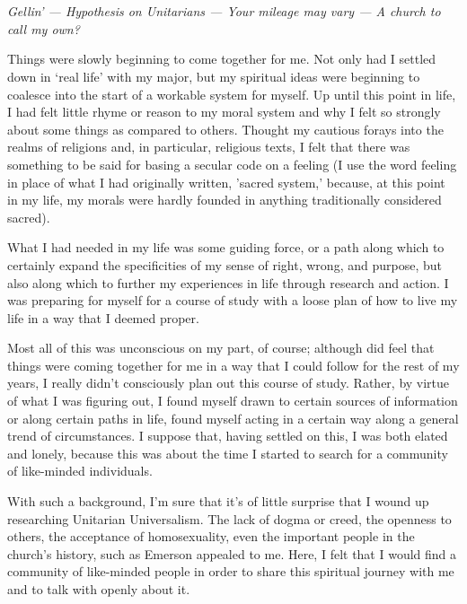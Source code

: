 \documentclass{book}
\begin{document}
\chapter{}
\begin{center}
	\emph{Gellin' --- Hypothesis on Unitarians --- Your mileage may vary --- A church to call my own?}
\end{center}

Things were slowly beginning to come together for me.  Not only had I settled down in `real life' with my major, but my spiritual ideas were beginning to coalesce into the start of a workable system for myself.  Up until this point in life, I had felt little rhyme or reason to my moral system and why I felt so strongly about some things as compared to others.  Thought my cautious forays into the realms of religions and, in particular, religious texts, I felt that there was something to be said for basing a secular code on a feeling (I use the word feeling in place of what I had originally written, 'sacred system,' because, at this point in my life, my morals were hardly founded in anything traditionally considered sacred).

What I had needed in my life was some guiding force, or a path along which to certainly expand the specificities of my sense of right, wrong, and purpose, but also along which to further my experiences in life through research and action.  I was preparing for myself for a course of study with a loose plan of how to live my life in a way that I deemed proper.

Most all of this was unconscious on my part, of course; although did feel that things were coming together for me in a way that I could follow for the rest of my years, I really didn't consciously plan out this course of study.  Rather, by virtue of what I was figuring out, I found myself drawn to certain sources of information or along certain paths in life, found myself acting in a certain way along a general trend of circumstances.  I suppose that, having settled on this, I was both elated and lonely, because this was about the time I started to search for a community of like-minded individuals.

With such a background, I'm sure that it's of little surprise that I wound up researching Unitarian Universalism.  The lack of dogma or creed, the openness to others, the acceptance of homosexuality, even the important people in the church's history, such as Emerson appealed to me.  Here, I felt that I would find a community of like-minded people in order to share this spiritual journey with me and to talk with openly about it.
\end{document}
